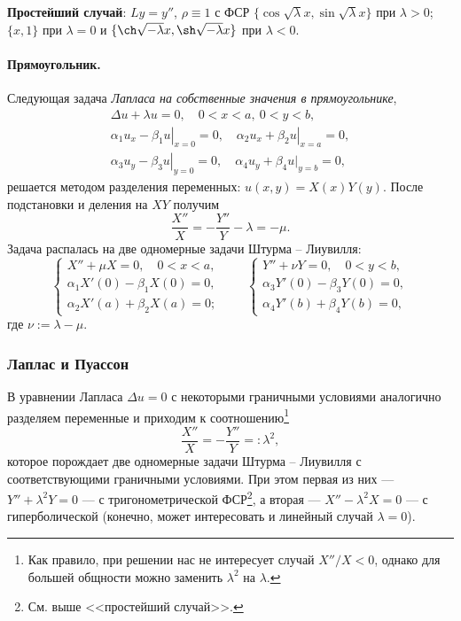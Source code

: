\label{sec:prost_sl}
\textbf{Простейший случай}: $ Ly = y'' $, $ \rho \equiv 1 $ с ФСР $
\{\cos\sqrt\lambda x, \sin\sqrt\lambda x\} $ при $ \lambda > 0 $; $ \{x, 1\} $
при $ \lambda = 0 $ и $ \{\ch\sqrt{-\lambda}x, \sh\sqrt{-\lambda}x\} $ при $
\lambda < 0 $.



\paragraph{Прямоугольник.}
Следующая задача \emph{Лапласа на собственные значения в прямоугольнике},  
\begin{gather*}
    \Delta u + \lambda u = 0, \quad 0 < x < a, \ 0 < y < b,\\
    \left.\alpha_1u_x - \beta_1u\right|_{x=0} = 0, \quad \left.\alpha_2u_x +
      \beta_2u\right|_{x=a} = 0,\\
      \left.\alpha_3 u_y - \beta_3u\right|_{y=0} = 0, \quad \left.\alpha_4u_y +
        \beta_4 u|_{y=b} = 0,
\end{gather*}
решается методом разделения переменных: $ u(x, y) = X(x)Y(y) $. После
подстановки и деления на $ XY $ получим 
\[
    \frac{X''}{X} = - \frac{Y''}{Y} - \lambda = -\mu.
\]
Задача распалась на две одномерные задачи Штурма -- Лиувилля: 
\[
  \begin{cases}
    X'' + \mu X = 0, \quad 0 < x < a,\\
    \alpha_1 X'(0) - \beta_1 X(0) = 0,\\
    \alpha_2 X'(a) + \beta_2 X(a) = 0;
  \end{cases} \qquad
  \begin{cases}
    Y'' + \nu Y = 0, \quad 0 < y < b,\\
    \alpha_3 Y'(0) - \beta_3 Y(0) = 0,\\
    \alpha_4 Y'(b) + \beta_4 Y(b) = 0,
  \end{cases}
\]
где $ \nu := \lambda - \mu $.

\subsubsection{Лаплас и Пуассон}
В уравнении Лапласа $ \Delta u = 0 $ с некоторыми граничными условиями
аналогично разделяем переменные и приходим к соотношению\footnote{Как правило,
  при решении нас не интересует случай $ X''/X < 0 $, однако для большей
  общности можно заменить $
\lambda^2 $ на $ \lambda $.}
\[
  \frac{X''}{X} = - \frac{Y''}{Y} =: \lambda^2,  
\]
которое порождает две одномерные задачи Штурма -- Лиувилля с соответствующими
граничными условиями. При этом первая из них --- $ Y'' + \lambda^2Y = 0 $ --- с
тригонометрической ФСР\footnote{См. выше <<простейший
случай>>.}, а вторая --- $ X'' - \lambda^2X = 0 $ --- с гиперболической
(конечно, может интересовать и линейный случай $ \lambda = 0 $).

